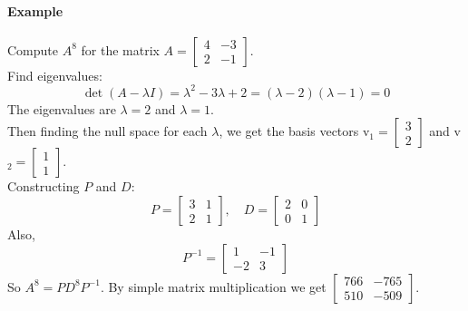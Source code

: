 \documentclass[../linear-algebra.tex]{subfiles}
\begin{document}
\paragraph{Example} Compute $A^8$ for the matrix $A = \begin{bmatrix} 4 & -3 \\ 2 & -1 \end{bmatrix}$.\\
Find eigenvalues:
$$\det(A - \lambda I) = \lambda^2 - 3\lambda + 2 = (\lambda - 2)(\lambda - 1) = 0$$
The eigenvalues are $\lambda = 2$ and $\lambda = 1$.\\
Then finding the null space for each $\lambda$, we get the basis vectors v$_1 = \begin{bmatrix} 3 \\ 2 \end{bmatrix}$ and v$_2 = \begin{bmatrix} 1 \\ 1 \end{bmatrix}$.\\
Constructing $P$ and $D$:
$$P = \begin{bmatrix} 3 & 1 \\ 2 & 1 \end{bmatrix}, \quad D = \begin{bmatrix} 2 & 0 \\ 0 & 1 \end{bmatrix}$$
Also,
$$P^{-1} = \begin{bmatrix} 1 & -1 \\ -2 & 3 \end{bmatrix}$$
So $A^8 = PD^8P^{-1}$.
By simple matrix multiplication we get $\begin{bmatrix} 766 & -765 \\ 510 & -509 \end{bmatrix}$.
\end{document}
